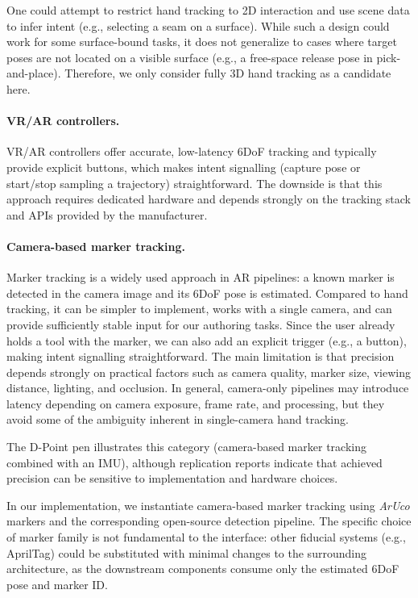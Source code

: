 One could attempt to restrict hand tracking to 2D interaction and use scene data to infer intent (e.g., selecting a seam on a surface). While such a design could work for some surface-bound tasks, it does not generalize to cases where target poses are not located on a visible surface (e.g., a free-space release pose in pick-and-place). Therefore, we only consider fully 3D hand tracking as a candidate here.


\paragraph{VR/AR controllers.} 
VR/AR controllers offer accurate, low-latency 6DoF tracking and typically provide explicit buttons, which makes intent signalling (capture pose or start/stop sampling a trajectory) straightforward. The downside is that this approach requires dedicated hardware and depends strongly on the tracking stack and APIs provided by the manufacturer.

\paragraph{Camera-based marker tracking.}
Marker tracking is a widely used approach in AR pipelines: a known marker is detected in the camera image and its 6DoF pose is estimated. Compared to hand tracking, it can be simpler to implement, works with a single camera, and can provide sufficiently stable input for our authoring tasks. Since the user already holds a tool with the marker, we can also add an explicit trigger (e.g., a button), making intent signalling straightforward. The main limitation is that precision depends strongly on practical factors such as camera quality, marker size, viewing distance, lighting, and occlusion. In general, camera-only pipelines may introduce latency depending on camera exposure, frame rate, and processing, but they avoid some of the ambiguity inherent in single-camera hand tracking.

The D-Point pen \cite{dpoint_github} illustrates this category (camera-based marker tracking combined with an IMU), although replication reports \cite{dpoint_issues} indicate that achieved precision can be sensitive to implementation and hardware choices.

In our implementation, we instantiate camera-based marker tracking using \emph{ArUco} markers and the corresponding open-source detection pipeline. The specific choice of marker family is not fundamental to the interface: other fiducial systems (e.g., AprilTag) could be substituted with minimal changes to the surrounding architecture, as the downstream components consume only the estimated 6DoF pose and marker ID.

